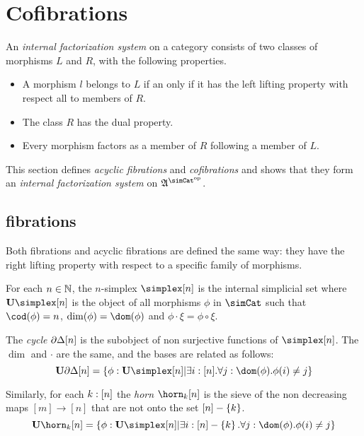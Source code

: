\documentclass[csh.tex]{subfiles}
\begin{document}
\section{Cofibrations}%

\begin{definition} An \emph{internal factorization system} on a category consists of two classes of morphisms $L$ and $R$, with the following properties.
\begin{itemize}
\item A morphism $l$ belongs to $L$ if an only if it has the left lifting property with respect all to members of $R$.
\item The class $R$ has the dual property.
\item Every morphism factors as a member of $R$ following a member of $L$.
\end{itemize}
\end{definition}

This section defines \emph{acyclic fibrations} and \emph{cofibrations} and shows that they form an \emph{internal factorization system} on $\ambient\s$.

\subsection{fibrations}
Both fibrations and acyclic fibrations are defined the same way: they have the right lifting property with respect to a specific family of morphisms.

\begin{definition} For each $n\in\mathbb N$, the $n$-simplex $\simplex[n]$ is the internal simplicial set where $\base{\simplex[n]}$ is the object of all morphisms $\phi$ in $\simCat$ such that $\cod(\phi) = n$, $\dim(\phi) = \dom(\phi)$ and $\phi\cdot \xi = \phi\circ \xi$.

The \emph{cycle} $\partial\Delta[n]$ is the subobject of non surjective functions of $\simplex[n]$. The $\dim$ and $\cdot$ are the same, and the bases are related as follows:
\[ \base{\cycle[n]} = \set{\phi\of\base{\simplex[n]}| \exists i\of[n].\forall j\of \dom(\phi).\phi(i)\neq j } \]

Similarly, for each $k:[n]$ the \emph{horn} $\horn_k[n]$ is the sieve of the non decreasing maps $[m]\to [n]$ that are not onto the set $[n]-\left\{k\right\}$.
\[ \base{\horn_k[n]} = \set{\phi\of\base{\simplex[n]}| \exists i\of[n]-\set k.\forall j\of \dom(\phi).\phi(i)\neq j } \]

\end{definition}
\end{document}
